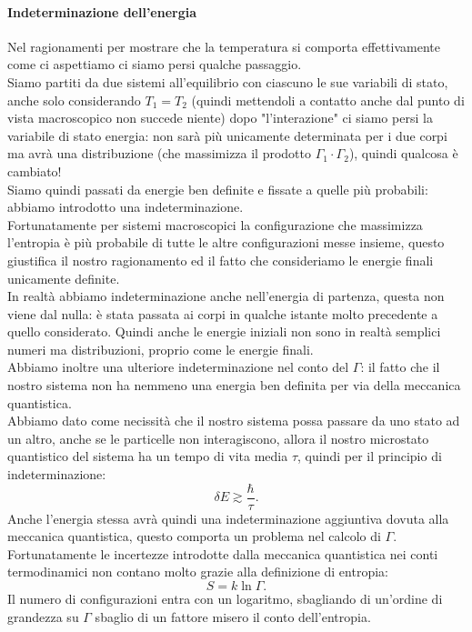\paragraph{Indeterminazione dell'energia}%
Nel ragionamenti per mostrare che la temperatura si comporta effettivamente come ci aspettiamo ci siamo persi qualche passaggio.\\ 
Siamo partiti da due sistemi all'equilibrio con ciascuno le sue variabili di stato, anche solo considerando $T_1= T_2$ (quindi mettendoli a contatto anche dal punto di vista macroscopico non succede niente) dopo "l'interazione" ci siamo persi la variabile di stato energia: non sarà più unicamente determinata per i due corpi ma avrà una distribuzione (che massimizza il prodotto $\Gamma_1\cdot \Gamma_2$), quindi qualcosa è cambiato!\\ 
Siamo quindi passati da energie ben definite e fissate a quelle più probabili: abbiamo introdotto una indeterminazione.\\
Fortunatamente per sistemi macroscopici la configurazione che massimizza l'entropia è più probabile di tutte le altre configurazioni messe insieme, questo giustifica il nostro ragionamento ed il fatto che consideriamo le energie finali unicamente definite.\\
In realtà abbiamo indeterminazione anche nell'energia di partenza, questa non viene dal nulla: è stata passata ai corpi in qualche istante molto precedente a quello considerato. Quindi anche le energie iniziali non sono in realtà semplici numeri ma distribuzioni, proprio come le energie finali.\\
Abbiamo inoltre una ulteriore indeterminazione nel conto del $\Gamma$: il fatto che il nostro sistema non ha nemmeno una energia ben definita per via della meccanica quantistica. \\
Abbiamo dato come necissità che il nostro sistema possa passare da uno stato ad un altro, anche se le particelle non interagiscono, allora il nostro microstato quantistico del sistema ha un tempo di vita media $\tau$, quindi per il principio di indeterminazione:
\[
	\delta E \gtrsim \frac{\hbar}{\tau}
.\] 
Anche l'energia stessa avrà quindi una indeterminazione aggiuntiva dovuta alla meccanica quantistica, questo comporta un problema nel calcolo di $\Gamma$.
Fortunatamente le incertezze introdotte dalla meccanica quantistica nei conti termodinamici non contano molto grazie alla definizione di entropia:
\[
	S = k \ln\Gamma
.\] 
Il numero di configurazioni entra con un logaritmo, sbagliando di un'ordine di grandezza su $\Gamma$ sbaglio di un fattore misero il conto dell'entropia.\\
